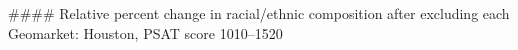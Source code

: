 #### Relative percent change in racial/ethnic composition after excluding each Geomarket: Houston, PSAT score 1010–1520
